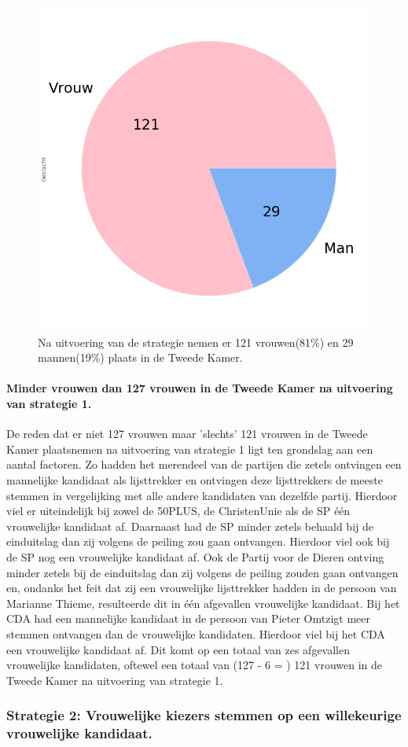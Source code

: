\begin{figure}[H]
\centering
	\includegraphics[width=0.35\linewidth]{pie_chart_topN.png}

			\caption{Na uitvoering van de strategie nemen er 121 vrouwen(81\%) en 29 mannen(19\%) plaats in de Tweede Kamer.}

\label{fig:pcS1V}
\end{figure}

\paragraph{Minder vrouwen dan 127 vrouwen in de Tweede Kamer na uitvoering van strategie 1.}
De reden dat er niet 127 vrouwen maar 'slechts' 121 vrouwen in de Tweede Kamer plaatsnemen na uitvoering van strategie 1 ligt ten grondslag aan een aantal factoren. Zo hadden het merendeel van de partijen die zetels ontvingen een mannelijke kandidaat als lijsttrekker en ontvingen deze lijsttrekkers de meeste stemmen in vergelijking met alle andere kandidaten van dezelfde partij. Hierdoor viel er uiteindelijk bij zowel de 50PLUS, de ChristenUnie als de SP één vrouwelijke kandidaat af. Daarnaast had de SP minder zetels behaald bij de einduitslag dan zij volgens de peiling zou gaan ontvangen. Hierdoor viel ook bij de SP nog een vrouwelijke kandidaat af. Ook de Partij voor de Dieren ontving minder zetels bij de einduitslag dan zij volgens de peiling zouden gaan ontvangen en, ondanks het feit dat zij een vrouwelijke lijsttrekker hadden in de persoon van Marianne Thieme, resulteerde dit in één afgevallen vrouwelijke kandidaat. Bij het CDA had een mannelijke kandidaat in de persoon van Pieter Omtzigt meer stemmen ontvangen dan de vrouwelijke kandidaten. Hierdoor viel bij het CDA een vrouwelijke kandidaat af. Dit komt op een totaal van zes afgevallen vrouwelijke kandidaten, oftewel een totaal van (127 - 6 = ) 121 vrouwen in de Tweede Kamer na uitvoering van strategie 1.  



\subsubsection{Strategie 2: Vrouwelijke kiezers stemmen op een willekeurige vrouwelijke kandidaat.}
